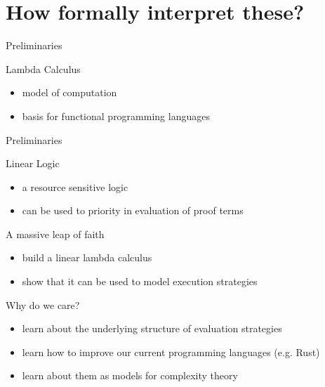 \documentclass[10pt]{beamer}
\begin{document}
\section[Preliminaries]{How formally interpret these?}

\begin{frame}[fragile]{Preliminaries}
  \begin{alertblock}{Lambda Calculus}
    \begin{itemize}
      \item model of computation
      \item basis for functional programming languages
    \end{itemize}
  \end{alertblock}
\end{frame}

\begin{frame}[fragile]{Preliminaries}
  \begin{alertblock}{Linear Logic}
    \begin{itemize}
      \item a resource sensitive logic
      \item can be used to priority in evaluation of proof terms
    \end{itemize}
  \end{alertblock}

  \pause

  \begin{alertblock}{A massive leap of faith}
    \begin{itemize}
      \item build a linear lambda calculus \cite[]{Maraist1995Jan}
      \item show that it can be used to model execution strategies
    \end{itemize}
  \end{alertblock}
\end{frame}

\begin{frame}
  \begin{alertblock}{Why do we care?}
    \begin{itemize}
      \item learn about the underlying structure of evaluation strategies
      \item learn how to improve our current programming languages (e.g. Rust)
      \item learn about them as models for complexity theory \cite[]{10.1145/3371095}
    \end{itemize}
  \end{alertblock}
\end{frame}
\end{document}
